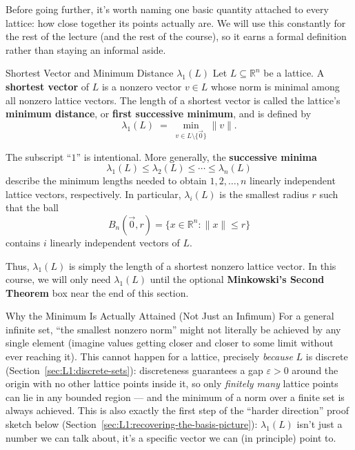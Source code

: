 Before going further, it's worth naming one basic quantity attached to every lattice: how close together its points actually are. We will use this constantly for the rest of the lecture (and the rest of the course), so it earns a formal definition rather than staying an informal aside.

\begin{defbox}{Shortest Vector and Minimum Distance $\lambda_1(L)$}
Let $L \subseteq \mathbb{R}^n$ be a lattice. A \textbf{shortest vector} of $L$ is a nonzero vector $v \in L$ whose norm is minimal among all nonzero lattice vectors. The length of a shortest vector is called the lattice's \textbf{minimum distance}, or \textbf{first successive minimum}, and is defined by
\[
\lambda_1(L)
\;=\;
\min_{v \in L \setminus \{\vec{0}\}} \|v\|.
\]

The subscript ``$1$'' is intentional. More generally, the \textbf{successive minima}
\[
\lambda_1(L) \leq \lambda_2(L) \leq \cdots \leq \lambda_n(L)
\]
describe the minimum lengths needed to obtain $1,2,\ldots,n$ linearly independent lattice vectors, respectively. In particular, $\lambda_i(L)$ is the smallest radius $r$ such that the ball
\[
B_n(\vec{0},r)
=
\{x\in\mathbb{R}^n : \|x\|\leq r\}
\]
contains $i$ linearly independent vectors of $L$.

Thus, $\lambda_1(L)$ is simply the length of a shortest nonzero lattice vector. In this course, we will only need $\lambda_1(L)$ until the optional \textbf{Minkowski's Second Theorem} box near the end of this section.
\end{defbox}

\begin{rmkbox}{Why the Minimum Is Actually Attained (Not Just an Infimum)}
For a general infinite set, ``the smallest nonzero norm'' might not literally be achieved by any single element (imagine values getting closer and closer to some limit without ever reaching it). This cannot happen for a lattice, precisely \emph{because} $L$ is discrete (Section~\ref{sec:L1:discrete-sets}): discreteness guarantees a gap $\varepsilon>0$ around the origin with no other lattice points inside it, so only \emph{finitely many} lattice points can lie in any bounded region --- and the minimum of a norm over a finite set is always achieved. This is also exactly the first step of the ``harder direction'' proof sketch below (Section~\ref{sec:L1:recovering-the-basis-picture}): $\lambda_1(L)$ isn't just a number we can talk about, it's a specific vector we can (in principle) point to.
\end{rmkbox}

